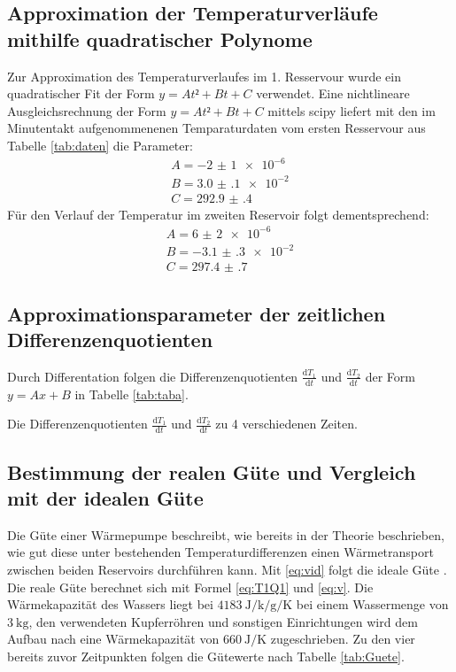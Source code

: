 \subsection{Approximation der Temperaturverläufe mithilfe quadratischer Polynome}
 Zur Approximation des Temperaturverlaufes im 1. Resservour wurde ein
 quadratischer Fit der Form $y = At²+Bt+C$ verwendet. Eine nichtlineare
 Ausgleichsrechnung der Form $y = At²+Bt+C$ mittels scipy\cite{scipy} liefert mit den im Minutentakt
 aufgenommenenen Temparaturdaten vom ersten Resservour aus Tabelle \ref{tab:daten}
 die Parameter:
 \begin{displaymath}
\begin{aligned}
 A = \num{-2(1)e-6}\\
 B = \num{3.0(1)e-2}\\
 C = \num{292.9(4)}
 \end{aligned}
 \end{displaymath}
 Für den Verlauf der Temperatur im zweiten Reservoir folgt dementsprechend:
 \begin{displaymath}
\begin{aligned}
 A = \num{6(2)e-6}\\
 B = \num{-3.1(3)e-2}\\
 C = \num{297.4(7)}
 \end{aligned}
 \end{displaymath}



\subsection{Approximationsparameter der zeitlichen Differenzenquotienten}

Durch Differentation folgen die Differenzenquotienten
$\frac{\text{d}T_1}{\text{d}t}$ und $\frac{\text{d}T_2}{\text{d}t}$ der Form $y = Ax+B$ in Tabelle \ref{tab:taba}.

\begin{table}
  \centering
  \caption{Die Differenzenquotienten $\frac{\text{d}T_1}{\text{d}t}$ und $\frac{\text{d}T_2}{\text{d}t}$ zu 4 verschiedenen Zeiten.}
  \label{tab:Ableitungen}
\end{table}

\subsection{Bestimmung der realen Güte und Vergleich mit der idealen Güte}
Die Güte einer Wärmepumpe beschreibt, wie bereits in der Theorie beschrieben,
wie gut diese unter bestehenden Temperaturdifferenzen einen Wärmetransport zwischen
beiden Reservoirs durchführen kann. Mit \ref{eq:vid} folgt die ideale Güte . Die
reale Güte berechnet sich mit Formel \ref{eq:T1Q1} und \ref{eq:v}. Die Wärmekapazität des Wassers
liegt bei $\SI{4183}{\joule\per\kilo\per\gram\per\kelvin}$ bei einem Wassermenge von $\SI{3}{\kilo\gram}$, den verwendeten
Kupferröhren und sonstigen Einrichtungen wird dem Aufbau nach eine Wärmekapazität von $\SI{660}{\joule\per\kelvin}$ zugeschrieben.
Zu den vier bereits zuvor Zeitpunkten folgen die Gütewerte nach Tabelle \ref{tab:Guete}.

